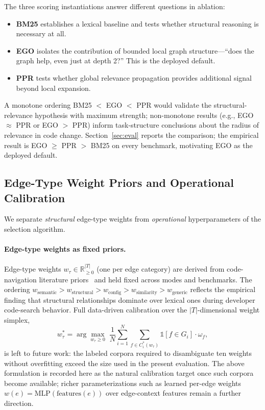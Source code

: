 \documentclass[11pt, a4paper]{article}
\providecommand{\mathbbm}[1]{\mathds{#1}}
\begin{document}
The three scoring instantiations answer different questions in ablation:
\begin{itemize}
    \item \textbf{BM25} establishes a lexical baseline and tests whether structural reasoning is necessary at all.
    \item \textbf{EGO} isolates the contribution of bounded local graph structure---``does the graph help, even just at depth 2?'' This is the deployed default.
    \item \textbf{PPR} tests whether global relevance propagation provides additional signal beyond local expansion.
\end{itemize}
A monotone ordering BM25 $<$ EGO $<$ PPR would validate the structural-relevance hypothesis with maximum strength; non-monotone results (e.g., EGO $\approx$ PPR or EGO $>$ PPR) inform task-structure conclusions about the radius of relevance in code change. Section~\ref{sec:eval} reports the comparison; the empirical result is EGO $\geq$ PPR $>$ BM25 on every benchmark, motivating EGO as the deployed default.

\subsection{Edge-Type Weight Priors and Operational Calibration}
\label{sec:weight-calibration}

We separate \emph{structural} edge-type weights from \emph{operational} hyperparameters of the selection algorithm.

\paragraph{Edge-type weights as fixed priors.} Edge-type weights $w_\tau \in \mathbb{R}_{\geq 0}^{|T|}$ (one per edge category) are derived from code-navigation literature priors~\cite{ko2006exploratory, robillard2004effective} and held fixed across modes and benchmarks. The ordering $w_{\mathrm{semantic}} > w_{\mathrm{structural}} > w_{\mathrm{config}} > w_{\mathrm{similarity}} > w_{\mathrm{generic}}$ reflects the empirical finding that structural relationships dominate over lexical ones during developer code-search behavior. Full data-driven calibration over the $|T|$-dimensional weight simplex,
\begin{equation}
w_\tau^* = \arg\max_{w_\tau \geq 0} \; \frac{1}{N} \sum_{i=1}^N \sum_{f \in C_i^*(w_\tau)} \mathbbm{1}[f \in G_i] \cdot \omega_f,
\end{equation}
is left to future work: the labeled corpora required to disambiguate ten weights without overfitting exceed the size used in the present evaluation. The above formulation is recorded here as the natural calibration target once such corpora become available; richer parameterizations such as learned per-edge weights $w(e) = \mathrm{MLP}(\mathrm{features}(e))$ over edge-context features remain a further direction.
\end{document}
